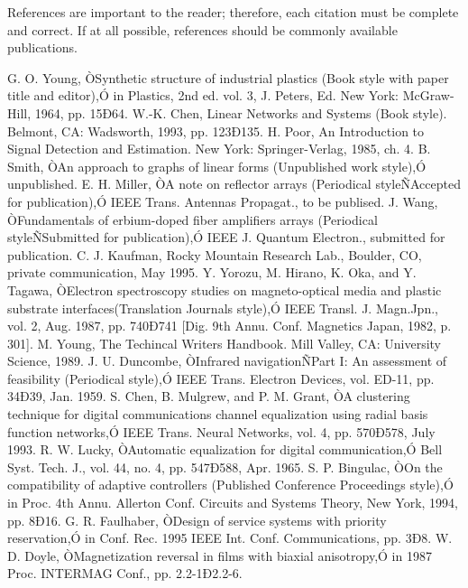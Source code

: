 \documentclass[a4paper, 10pt, conference]{ieeeconf}      %
\begin{document}
References are important to the reader; therefore, each citation must be complete and correct. If at all possible, references should be commonly available publications.



\begin{thebibliography}{99}

 G. O. Young, ÒSynthetic structure of industrial plastics (Book style with paper title and editor),Ó 	in Plastics, 2nd ed. vol. 3, J. Peters, Ed.  New York: McGraw-Hill, 1964, pp. 15Ð64.
 W.-K. Chen, Linear Networks and Systems (Book style).	Belmont, CA: Wadsworth, 1993, pp. 123Ð135.
 H. Poor, An Introduction to Signal Detection and Estimation.   New York: Springer-Verlag, 1985, ch. 4.
 B. Smith, ÒAn approach to graphs of linear forms (Unpublished work style),Ó unpublished.
 E. H. Miller, ÒA note on reflector arrays (Periodical styleÑAccepted for publication),Ó IEEE Trans. Antennas Propagat., to be publised.
 J. Wang, ÒFundamentals of erbium-doped fiber amplifiers arrays (Periodical styleÑSubmitted for publication),Ó IEEE J. Quantum Electron., submitted for publication.
 C. J. Kaufman, Rocky Mountain Research Lab., Boulder, CO, private communication, May 1995.
 Y. Yorozu, M. Hirano, K. Oka, and Y. Tagawa, ÒElectron spectroscopy studies on magneto-optical media and plastic substrate interfaces(Translation Journals style),Ó IEEE Transl. J. Magn.Jpn., vol. 2, Aug. 1987, pp. 740Ð741 [Dig. 9th Annu. Conf. Magnetics Japan, 1982, p. 301].
 M. Young, The Techincal Writers Handbook.  Mill Valley, CA: University Science, 1989.
 J. U. Duncombe, ÒInfrared navigationÑPart I: An assessment of feasibility (Periodical style),Ó IEEE Trans. Electron Devices, vol. ED-11, pp. 34Ð39, Jan. 1959.
 S. Chen, B. Mulgrew, and P. M. Grant, ÒA clustering technique for digital communications channel equalization using radial basis function networks,Ó IEEE Trans. Neural Networks, vol. 4, pp. 570Ð578, July 1993.
 R. W. Lucky, ÒAutomatic equalization for digital communication,Ó Bell Syst. Tech. J., vol. 44, no. 4, pp. 547Ð588, Apr. 1965.
 S. P. Bingulac, ÒOn the compatibility of adaptive controllers (Published Conference Proceedings style),Ó in Proc. 4th Annu. Allerton Conf. Circuits and Systems Theory, New York, 1994, pp. 8Ð16.
 G. R. Faulhaber, ÒDesign of service systems with priority reservation,Ó in Conf. Rec. 1995 IEEE Int. Conf. Communications, pp. 3Ð8.
 W. D. Doyle, ÒMagnetization reversal in films with biaxial anisotropy,Ó in 1987 Proc. INTERMAG Conf., pp. 2.2-1Ð2.2-6.

\end{thebibliography}
\end{document}
